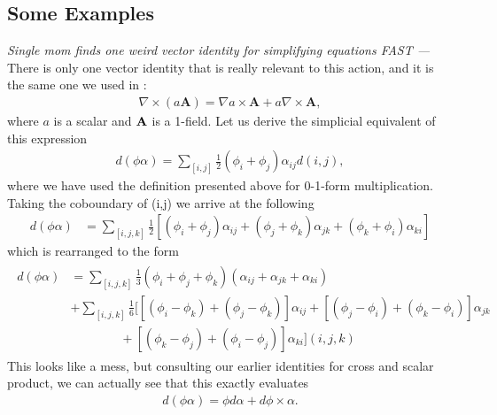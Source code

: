 \subsection{Some Examples}
\begin{shaded}
    {\it Single mom finds one weird vector identity for simplifying equations FAST --- } There is only one vector identity that is really relevant to this action, and it is the same one we used in \textsection{\ref{sec:continuous_special_time}}:
    \begin{align} 
            \nabla \times (a \textbf{A}) = \nabla a \times \textbf{A} + a \nabla \times \textbf{A},
        \end{align}
        where $a$ is a scalar and $\textbf A$ is a 1-field. Let us derive the simplicial equivalent of this expression
        \begin{align}
            d(\phi \alpha) = \sum_{[i,j]}\frac 12 (\phi_i + \phi_j) \alpha_{ij} d(i,j),
        \end{align}
        where we have used the definition presented above for 0-1-form multiplication. Taking the coboundary of (i,j) we arrive at the following
        \begin{align}
             d(\phi \alpha) &= \sum_{[i,j,k]}\frac 12 
             \left [
             (\phi_i + \phi_j)\alpha_{ij}
             + (\phi_j + \phi_k)\alpha_{jk}
             +(\phi_k + \phi_i)\alpha_{ki}
             \right ]
        \end{align}
    which is rearranged to the form
    \begin{align}
        \begin{aligned}
            d(\phi \alpha) &= \sum_{[i,j,k]} \frac 13 (\phi_i + \phi_j +\phi_k)(\alpha_{ij} + \alpha_{jk}+\alpha_{ki}) \\ 
            &
            + \sum_{[i,j,k]} \frac 16 \bigg [
            [(\phi_i - \phi_k) + (\phi_j - \phi_k)]\alpha_{ij}
            + [(\phi_j - \phi_i) + (\phi_k - \phi_i)]\alpha_{jk}\\& \qquad \qquad 
            + [(\phi_k - \phi_j) + (\phi_i - \phi_j)]\alpha_{ki}
            \bigg ] (i,j,k)
        \end{aligned}
    \end{align}
    This looks like a mess, but consulting our earlier identities for cross and scalar product, we can actually see that this exactly evaluates
    \begin{align}
        d(\phi \alpha) = \phi d\alpha + d\phi \times \alpha.
    \end{align}
\end{shaded}